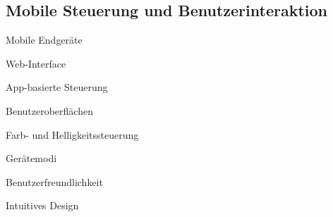 \subsection{Mobile Steuerung und Benutzerinteraktion} 
Mobile Endgeräte

Web-Interface

App-basierte Steuerung

Benutzeroberflächen

Farb- und Helligkeitssteuerung

Gerätemodi

Benutzerfreundlichkeit

Intuitives Design